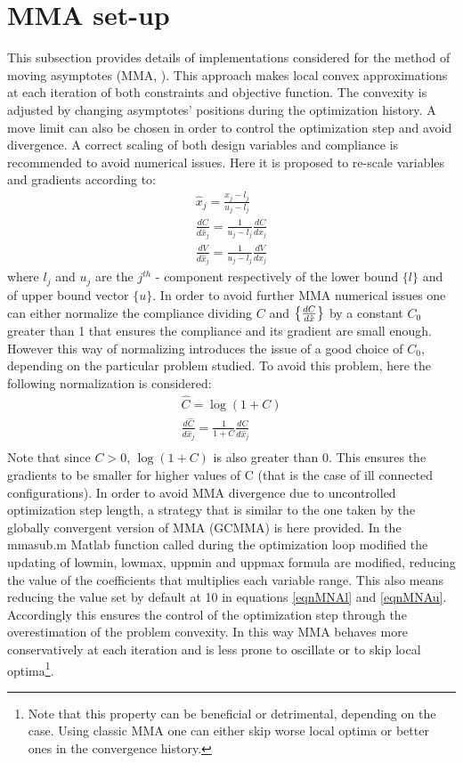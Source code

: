 \section{MMA set-up}
\label{A1}
This subsection provides details of implementations considered for the method of moving asymptotes (MMA, \cite{svanberg1987method}). This approach makes local convex approximations at each iteration of both constraints and objective function. The convexity is adjusted by changing asymptotes' positions during the optimization history. A move limit can also be chosen in order to control the optimization step and avoid divergence. A correct scaling of both design variables and compliance is recommended to avoid numerical issues. Here it is proposed to re-scale variables and gradients according to:
\begin{eqnarray}
\hat{x}_j= \frac{x_j-l_{j}}{u_j-l_j}\\
\frac{dC}{d\hat{x}_j}=\frac{1}{u_j-l_j}\frac{dC}{dx_j}\\
\frac{dV}{d\hat{x}_j}=\frac{1}{u_j-l_j}\frac{dV}{dx_j}
\end{eqnarray}
where $l_j$ and $u_j$ are the $j^{th}$ - component respectively of the lower bound $\{l\}$ and of upper bound vector $\{u\}$. 
In order to avoid further MMA numerical issues one can either normalize the compliance dividing $C$ and $\left\{{\frac{dC}{d\hat{x}}}\right\}$ by a constant $C_0$ greater than 1 that ensures the compliance and its gradient are small enough. However this way of normalizing introduces the issue of a good choice of $C_0$, depending on the particular problem studied. To avoid this problem, here the following normalization is considered:
\begin{eqnarray}
\hat{C}=\log{\left(1+C\right)}\\
\frac{d\hat{C}}{d\hat{x}_j}=\frac{1}{1+C}\frac{dC}{d\hat{x}_j}\\
\end{eqnarray}
Note that since $C>0$, $\log{\left(1+C\right)}$ is also greater than $0$. This ensures the gradients to be smaller for higher values of C (that is the case of ill connected configurations). In order to avoid MMA divergence due to uncontrolled optimization step length, a strategy that is similar to the one taken by the globally convergent version of MMA (GCMMA) \cite{svanberg2002class} is here provided. In the mmasub.m Matlab function called during the optimization loop modified the updating of lowmin, lowmax, uppmin and uppmax formula are modified, reducing the value of the coefficients that multiplies each variable range. This also means reducing the value set by default at 10 in equations \eqref{eqnMNAl} and \eqref{eqnMNAu}.
Accordingly this ensures the control of the optimization step through the overestimation of the problem convexity. In this way MMA behaves more conservatively at each iteration and is less prone to oscillate or to skip local optima\footnote{Note that this property can be beneficial or detrimental, depending on the case. Using classic MMA one can either skip worse local optima or better ones in the convergence history.}.